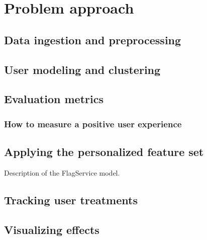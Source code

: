 \chapter{Problem approach}

\label{Chapter4}



\section{Data ingestion and preprocessing} %
\label{sec:data_ingestion_and_preprocessing}


\section{User modeling and clustering} %
\label{sec:user_modeling_and_clustering}


\section{Evaluation metrics} %
\label{sec:evaluation_metrics}

\subsection{How to measure a positive user experience} %


\section{Applying the personalized feature set} %
\label{sec:applying_the_personalized_feature_set}

Description of the FlagService model.


\section{Tracking user treatments} %
\label{sec:tracking_user_treatments}


\section{Visualizing effects} %
\label{sec:visualizing_effects}


